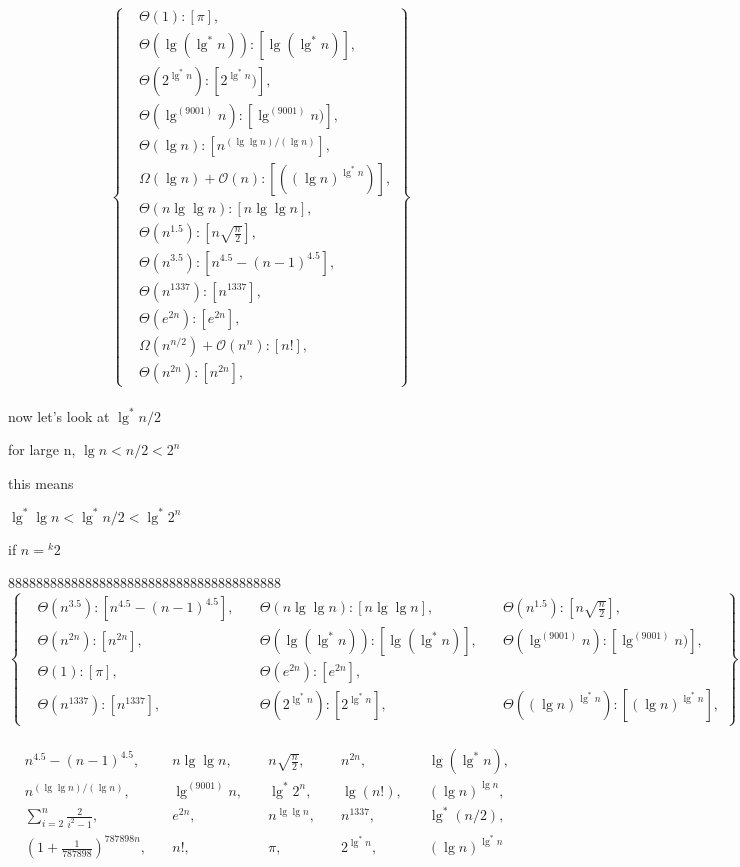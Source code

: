 \documentclass[11pt,fleqn]{article}
\theoremstyle{definition}
\theoremstyle{remark}
\begin{document}
\[
\left\{
\begin{aligned}
& \Theta(1): [\pi],\\
& \Theta(\lg(\lg^*n)): [\lg(\lg^*n)],\\
& \Theta(2^{\lg^*n}): [2^{\lg^*n})],\\
& \Theta(\lg^{(9001)} n): [\lg^{(9001)} n)],\\
& \Theta(\lg n): [n^{({\lg \lg n})/({\lg n})}],\\
& \Omega(\lg n) + \mathcal{O}(n): [({(\lg n)}^{\lg^*{n}})],\\
& \Theta(n\lg \lg n): [n\lg \lg n],\\
& \Theta(n^{1.5}): [n\sqrt{\frac{n}{2}}],\\
& \Theta(n^{3.5}): [n^{4.5} - (n - 1)^{4.5}],\\ 
& \Theta(n^{1337}): [n^{1337}],\\
& \Theta(e^{2n}): [e^{2n}],\\
& \Omega(n^{n/2}) + \mathcal{O}(n^n): [n!],\\
& \Theta(n^{2n}): [n^{2n}],
\end{aligned}
\right\}
\]\\

now let's look at $\lg^*{n/2}$

for large n, $\lg n < n/2 < 2^n$

this means

$\lg^* \lg n < \lg^* n/2 < \lg^* 2^n$

if $n = {}^k 2$

888888888888888888888888888888888888888
\[
\left\{
\begin{aligned}
& \Theta(n^{3.5}): [n^{4.5} - (n - 1)^{4.5}], 
& \quad \Theta(n \lg \lg n): [n \lg \lg n],
& \quad \Theta(n^{1.5}): [n\sqrt{\frac{n}{2}}],\\
& \Theta(n^{2n}): [n^{2n}],
& \quad \Theta(\lg(\lg^*n)): [\lg(\lg^*n)],
& \quad \Theta(\lg^{(9001)} n): [\lg^{(9001)} n)],\\
& \Theta(1): [\pi],
& \quad \Theta(e^{2n}): [e^{2n}],\\
& \Theta(n^{1337}): [n^{1337}],
& \quad \Theta(2^{\lg^*{n}}): [2^{\lg^*{n}}],
& \quad \Theta({(\lg n)}^{\lg^*{n}}): [{(\lg n)}^{\lg^*{n}}],
\end{aligned}
\right\}
\]\\


\[
\begin{aligned}
& n^{4.5} - (n - 1)^{4.5}, & \quad n \lg \lg n, & \quad n\sqrt{\frac{n}{2}}, & \quad n^{2n}, & \quad \lg(\lg^*n), \\
& n^{({\lg \lg n})/({\lg n})}, & \quad \lg^{(9001)} n, & \quad \lg^*2^{n}, & \quad \lg(n!), & \quad (\lg n)^{\lg n}, \\
& \sum_{i=2}^n \frac{2}{{i}^2-1}, & \quad e^{2n}, & \quad n^{\lg \lg n}, & \quad n^{1337}, & \quad \lg^*{(n/2)}, \\
& (1 + \frac{1}{787898})^{787898n}, & \quad n!, & \quad \pi, & \quad 2^{\lg^*n}, & \quad (\lg n)^{\lg^* n}
\end{aligned}
\]\\
\end{document}
